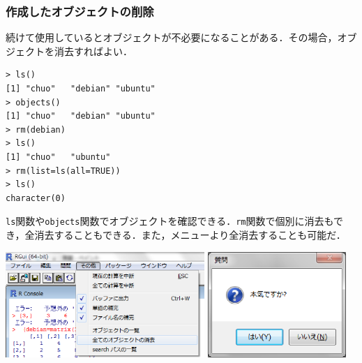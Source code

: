 \subsubsection{作成したオブジェクトの削除}
続けて使用しているとオブジェクトが不必要になることがある．その場合，オブジェクトを消去すればよい．
\begin{breakbox}
\begin{verbatim}
> ls()
[1] "chuo"   "debian" "ubuntu"
> objects()
[1] "chuo"   "debian" "ubuntu"
> rm(debian)
> ls()
[1] "chuo"   "ubuntu"
> rm(list=ls(all=TRUE))
> ls()
character(0)
\end{verbatim}
\end{breakbox}
{\tt ls}関数や{\tt objects}関数でオブジェクトを確認できる．{\tt rm}関数で個別に消去もでき，全消去することもできる．また，メニューより全消去することも可能だ．

\includegraphics[height=4cm]{img/windows/rmall.eps}\hspace{0.8em} \includegraphics[height=4cm]{img/windows/honki.eps}
